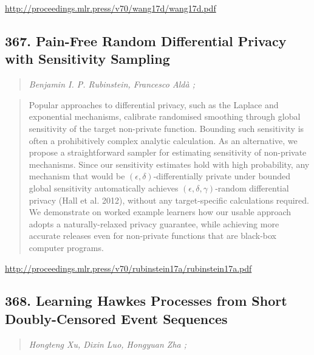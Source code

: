 \documentclass{article}
\begin{document}
\href{http://proceedings.mlr.press/v70/wang17d/wang17d.pdf}{http://proceedings.mlr.press/v70/wang17d/wang17d.pdf}

\subsection{367. Pain-Free Random Differential Privacy with Sensitivity Sampling}

\begin{quote}
\footnotesize{\textit{Benjamin I. P. Rubinstein, Francesco Aldà ;}}

\end{quote}

\begin{quote}
    Popular approaches to differential privacy, such as the Laplace and exponential mechanisms, calibrate randomised smoothing through global sensitivity of the target non-private function. Bounding such sensitivity is often a prohibitively complex analytic calculation. As an alternative, we propose a straightforward sampler for estimating sensitivity of non-private mechanisms. Since our sensitivity estimates hold with high probability, any mechanism that would be $(\epsilon,\delta)$-differentially private under bounded global sensitivity automatically achieves $(\epsilon,\delta,\gamma)$-random differential privacy (Hall et al. 2012), without any target-specific calculations required. We demonstrate on worked example learners how our usable approach adopts a naturally-relaxed privacy guarantee, while achieving more accurate releases even for non-private functions that are black-box computer programs.  
\end{quote}

\href{http://proceedings.mlr.press/v70/rubinstein17a/rubinstein17a.pdf}{http://proceedings.mlr.press/v70/rubinstein17a/rubinstein17a.pdf}

\subsection{368. Learning Hawkes Processes from Short Doubly-Censored Event Sequences}

\begin{quote}
\footnotesize{\textit{Hongteng Xu, Dixin Luo, Hongyuan Zha ;}}

\end{quote}
\end{document}
